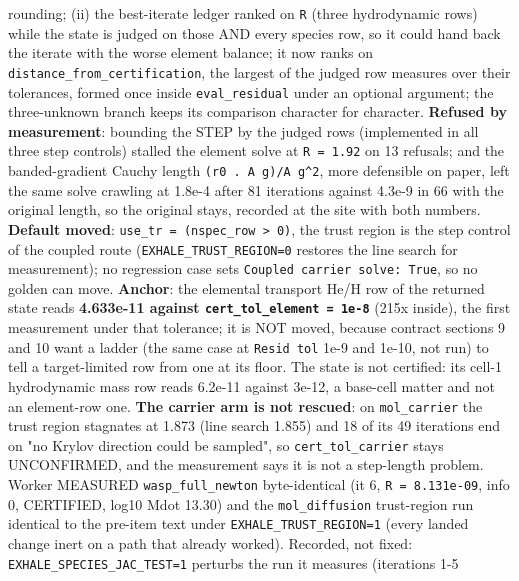 \documentclass[english,a4paper]{my_memo}
\begin{document}
\begin{itemize}
  rounding; (ii) the best-iterate ledger ranked on \texttt{\textbar{}\textbar{}R\textbar{}\textbar{}} (three
  hydrodynamic rows) while the state is judged on those AND every species
  row, so it could hand back the iterate with the worse element balance; it
  now ranks on \texttt{distance\_from\_certification}, the largest of the judged row
  measures over their tolerances, formed once inside \texttt{eval\_residual} under
  an optional argument; the three-unknown branch keeps its comparison
  character for character. \textbf{Refused by measurement}: bounding the STEP by
  the judged rows (implemented in all three step controls) stalled the
  element solve at \texttt{\textbar{}\textbar{}R\textbar{}\textbar{}\ =\ 1.92} on 13 refusals; and the banded-gradient
  Cauchy length \texttt{(r0\ .\ A\ g)/\textbar{}\textbar{}A\ g\textbar{}\textbar{}\^{}2}, more defensible on paper, left the
  same solve crawling at 1.8e-4 after 81 iterations against 4.3e-9 in 66
  with the original length, so the original stays, recorded at the site with
  both numbers. \textbf{Default moved}: \texttt{use\_tr\ =\ (nspec\_row\ \textgreater{}\ 0)}, the trust
  region is the step control of the coupled route (\texttt{EXHALE\_TRUST\_REGION=0}
  restores the line search for measurement); no regression case sets
  \texttt{Coupled\ carrier\ solve:\ True}, so no golden can move. \textbf{Anchor}: the
  elemental transport He/H row of the returned state reads \textbf{4.633e-11
  against \texttt{cert\_tol\_element\ =\ 1e-8}} (215x inside), the first measurement
  under that tolerance; it is NOT moved, because contract sections 9 and 10
  want a ladder (the same case at \texttt{Resid\ tol} 1e-9 and 1e-10, not run) to
  tell a target-limited row from one at its floor. The state is not
  certified: its cell-1 hydrodynamic mass row reads 6.2e-11 against 3e-12, a
  base-cell matter and not an element-row one. \textbf{The carrier arm is not
  rescued}: on \texttt{mol\_carrier} the trust region stagnates at 1.873 (line
  search 1.855) and 18 of its 49 iterations end on "no Krylov direction
  could be sampled", so \texttt{cert\_tol\_carrier} stays UNCONFIRMED, and the
  measurement says it is not a step-length problem. Worker MEASURED
  \texttt{wasp\_full\_newton} byte-identical (it 6, \texttt{\textbar{}\textbar{}R\textbar{}\textbar{}\ =\ 8.131e-09}, info 0,
  CERTIFIED, log10 Mdot 13.30) and the \texttt{mol\_diffusion} trust-region run
  identical to the pre-item text under \texttt{EXHALE\_TRUST\_REGION=1} (every landed
  change inert on a path that already worked). Recorded, not fixed:
  \texttt{EXHALE\_SPECIES\_JAC\_TEST=1} perturbs the run it measures (iterations 1-5

\end{itemize}
\end{document}
